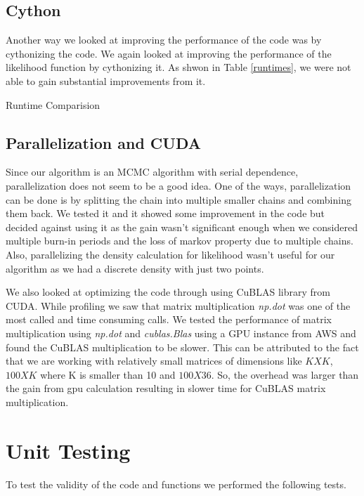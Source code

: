 \documentclass{article}
\begin{document}
\subsection{Cython}
Another way we looked at improving the performance of the code was by cythonizing the code. We again looked at improving the performance of the likelihood function by cythonizing it. As shwon in Table \ref{runtimes}, we were not able to gain substantial improvements from it.\\

\begin{table}[ht]
\centering
\caption{Runtime Comparision \label{runtimes}}

\end{table}

\subsection{Parallelization and CUDA}
Since our algorithm is an MCMC algorithm with serial dependence, parallelization does not seem to be a good idea. One of the ways, parallelization can be done is by splitting the chain into multiple smaller chains and combining them back. We tested it and it showed some improvement in the code but decided against using it as the gain wasn't significant enough when we considered multiple burn-in periods and the loss of markov property due to multiple chains. Also, parallelizing the density calculation for likelihood wasn't useful for our algorithm as we had a discrete density with just two points.

We also looked at optimizing the code through using CuBLAS library from CUDA. While profiling we saw that matrix multiplication \textit{np.dot} was one of the most called and time consuming calls. We tested the performance of matrix multiplication using \textit{np.dot} and \textit{cublas.Blas} using a GPU instance from AWS and found the CuBLAS multiplication to be slower. This can be attributed to the fact that we are working with relatively small matrices of dimensions like $KXK$, $100XK$ where K is smaller than 10 and  $100X36$. So, the overhead was larger than the gain from gpu calculation resulting in slower time for CuBLAS matrix multiplication.


\section{Unit Testing}
To test the validity of the code and functions we performed the following tests.
\end{document}
